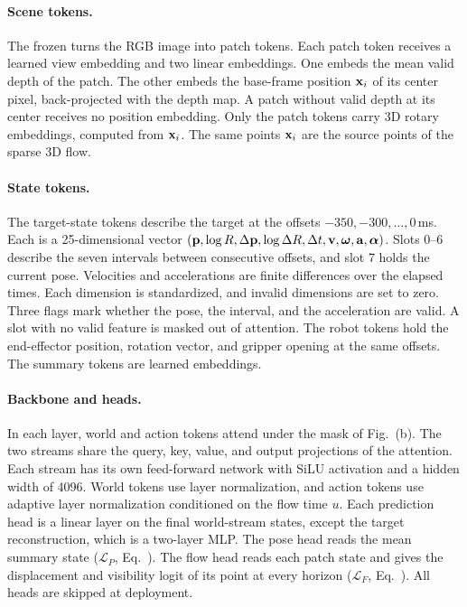 \paragraph{Scene tokens.}
The frozen \cfgVisualEncoder{} \cite{mae} turns the RGB image into \cfgPatches{} patch
tokens. Each patch token receives a learned view embedding and two linear embeddings.
One embeds the mean valid depth of the patch. The other embeds the base-frame position
$\mathbf{x}_i$ of its center pixel, back-projected with the depth map. A patch without
valid depth at its center receives no position embedding. Only the patch tokens carry 3D
rotary embeddings, computed from $\mathbf{x}_i$. The same points
$\mathbf{x}_i$ are the source points of the sparse 3D flow.

\paragraph{State tokens.}
The \cfgHistoryLen{} target-state tokens describe the target at the offsets
$-350,-300,\ldots,0$\,ms. Each is a 25-dimensional vector
$(\mathbf{p},\log R,\Delta\mathbf{p},\log\Delta R,\Delta t,\mathbf{v},\boldsymbol\omega,\mathbf{a},
\boldsymbol\alpha)$. Slots 0--6 describe the seven intervals between consecutive
offsets, and slot 7 holds the current pose. Velocities and
accelerations are finite differences over the elapsed times. Each dimension is
standardized, and invalid dimensions are set to zero. Three
flags mark whether the pose, the interval, and the acceleration are valid. A slot with
no valid feature is masked out of attention. The robot tokens hold the end-effector
position, rotation vector, and gripper opening at the same offsets.
The \cfgMetaTokens{} summary tokens are learned embeddings.

\paragraph{Backbone and heads.}
In each layer, world and action tokens attend under the mask of
Fig.~(b). The two streams share the query, key, value, and
output projections of the attention. Each stream has its own feed-forward network with
SiLU activation and a hidden width of 4096. World tokens use layer normalization, and
action tokens use adaptive layer normalization conditioned on the flow time $u$. Each
prediction head is a linear layer on the final world-stream states, except the target
reconstruction, which is a two-layer MLP. The pose head reads the mean summary state
($\mathcal L_P$, Eq.~). The flow head reads each patch state and
gives the displacement and visibility logit of its point at every horizon
($\mathcal L_F$, Eq.~). All heads are skipped at deployment.

